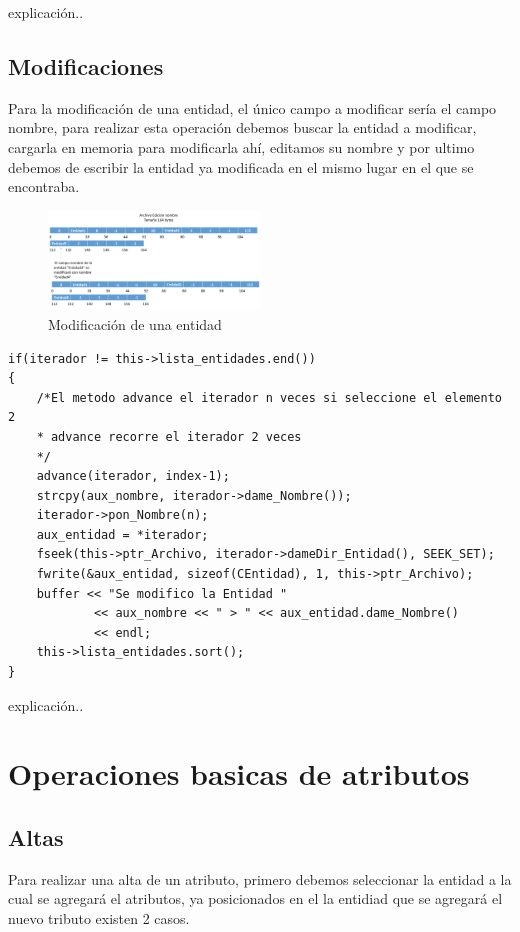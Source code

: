 explicación..

\newpage
\subsection{Modificaciones}
Para la modificación de una entidad, el único campo a modificar sería el campo nombre, para realizar esta operación debemos buscar la entidad a modificar, cargarla en memoria para modificarla ahí, editamos su nombre y por ultimo debemos de escribir la entidad ya modificada en el mismo lugar en el que se encontraba.

\begin{figure}[!ht]
\begin{center}
  \includegraphics[width=0.5\textwidth]{secciones/ejemploA/EdicionEntidad.png}
  \caption{Modificación de una entidad}
\end{center}
\end{figure}

\begin{lstlisting}[frame=single]
if(iterador != this->lista_entidades.end())
{
	/*El metodo advance el iterador n veces si seleccione el elemento 2
    * advance recorre el iterador 2 veces
    */
    advance(iterador, index-1);
    strcpy(aux_nombre, iterador->dame_Nombre());
    iterador->pon_Nombre(n);
    aux_entidad = *iterador;
    fseek(this->ptr_Archivo, iterador->dameDir_Entidad(), SEEK_SET);
    fwrite(&aux_entidad, sizeof(CEntidad), 1, this->ptr_Archivo);
    buffer << "Se modifico la Entidad "
    	    << aux_nombre << " > " << aux_entidad.dame_Nombre()
            << endl;
    this->lista_entidades.sort();
}
\end{lstlisting}

explicación..

\newpage
\section{Operaciones basicas de atributos}

\subsection{Altas}
Para realizar una alta de un atributo, primero debemos seleccionar la entidad a la cual se agregará el atributos, ya posicionados en el la entidiad que se agregará el nuevo tributo existen 2 casos.

